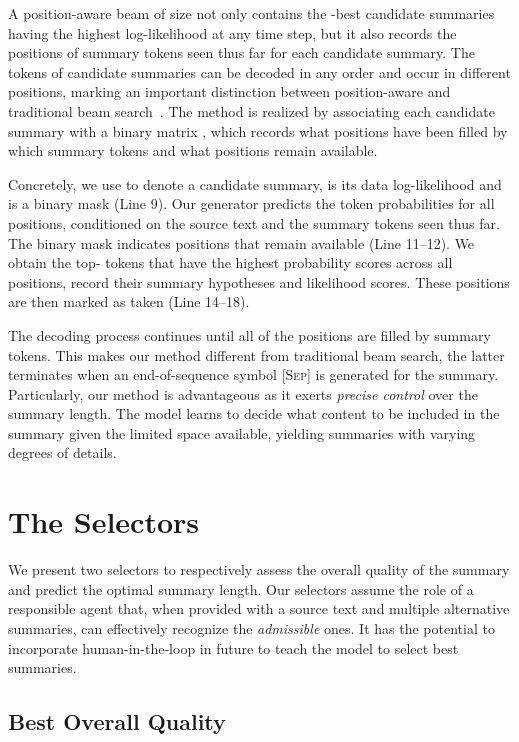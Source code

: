 \documentclass[11pt]{article}
\begin{document}
A position-aware beam of size  not only contains the -best candidate summaries having the highest log-likelihood at any time step, but it also records the positions of summary tokens seen thus far for each candidate summary.
The tokens of candidate summaries can be decoded in any order and occur in different positions, marking an important distinction between position-aware and traditional beam search~\cite{meister-etal-2020-beam}.
The method is realized by associating each candidate summary with a binary matrix , which records what positions have been filled by which summary tokens and what positions remain available.


Concretely, we use  to denote a candidate summary,  is its data log-likelihood and  is a binary mask (Line 9).
Our generator predicts the token probabilities  for all positions, conditioned on the source text and the summary tokens seen thus far.
The binary mask  indicates positions that remain available (Line 11--12).
We obtain the top- tokens that have the highest probability scores across all positions, record their summary hypotheses and likelihood scores.
These positions are then marked as taken (Line 14--18).


The decoding process continues until all of the  positions are filled by summary tokens.
This makes our method different from traditional beam search, the latter terminates when an end-of-sequence symbol \textsc{[Sep]} is generated for the summary.
Particularly, our method is advantageous as it exerts \emph{precise control} over the summary length. 
The model learns to decide what content to be included in the summary given the limited space available, yielding summaries with varying degrees of details.


\section{The Selectors}
\label{sec:selector}


We present two selectors to respectively assess the overall quality of the summary and predict the optimal summary length.
Our selectors assume the role of a responsible agent that, when provided with a source text and multiple alternative summaries, can effectively recognize the \emph{admissible} ones.
It has the potential to incorporate human-in-the-loop in future to teach the model to select best summaries.


\subsection{Best Overall Quality}
\end{document}
